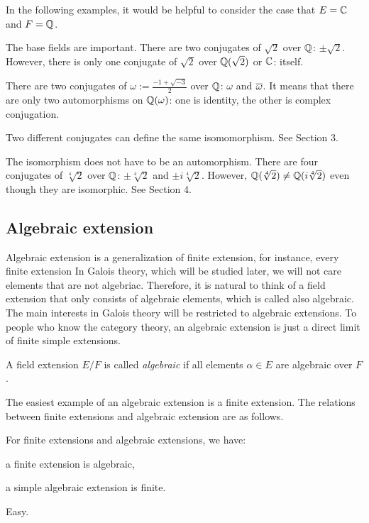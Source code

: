 \documentclass{../exp}
\begin{document}
In the following examples, it would be helpful to consider the case that $E=\mathbb{C}$ and $F=\mathbb{Q}$.
\begin{ex}
The base fields are important.
There are two conjugates of $\sqrt2$ over $\mathbb{Q}$: $\pm\sqrt2$.
However, there is only one conjugate of $\sqrt2$ over $\mathbb{Q}(\sqrt2)$ or $\mathbb{C}$: itself.
\end{ex}
\begin{ex}
There are two conjugates of $\omega:=\frac{-1+\sqrt{-3}}2$ over $\mathbb{Q}$: $\omega$ and $\overline\omega$.
It means that there are only two automorphisms on $\mathbb{Q}(\omega)$: one is identity, the other is complex conjugation.
\end{ex}
\begin{ex}
Two different conjugates can define the same isomomorphism.
See Section 3.
\end{ex}
\begin{ex}
The isomorphism does not have to be an automorphism.
There are four conjugates of $\sqrt[4]2$ over $\mathbb{Q}$: $\pm\sqrt[4]2$ and $\pm i\sqrt[4]2$.
However, $\mathbb{Q}(\sqrt[4]2)\ne\mathbb{Q}(i\sqrt[4]2)$ even though they are isomorphic.
See Section 4.
\end{ex}



\subsection{Algebraic extension}

Algebraic extension is a generalization of finite extension, for instance, every finite extension
In Galois theory, which will be studied later, we will not care elements that are not algebriac.
Therefore, it is natural to think of a field extension that only consists of algebraic elements, which is called also algebraic.
The main interests in Galois theory will be restricted to algebraic extensions.
To people who know the category theory, an algebraic extension is just a direct limit of finite simple extensions.

\begin{defn}
A field extension $E/F$ is called \emph{algebraic} if all elements $\alpha\in E$ are algebraic over $F$.
\end{defn}

The easiest example of an algebraic extension is a finite extension.
The relations between finite extensions and algebraic extension are as follows.

\begin{thm}
For finite extensions and algebraic extensions, we have:
\begin{cond}
\item a finite extension is algebraic,
\item a simple algebraic extension is finite.
\end{cond}
\end{thm}
\begin{pf} Easy. \end{pf}
\end{document}
